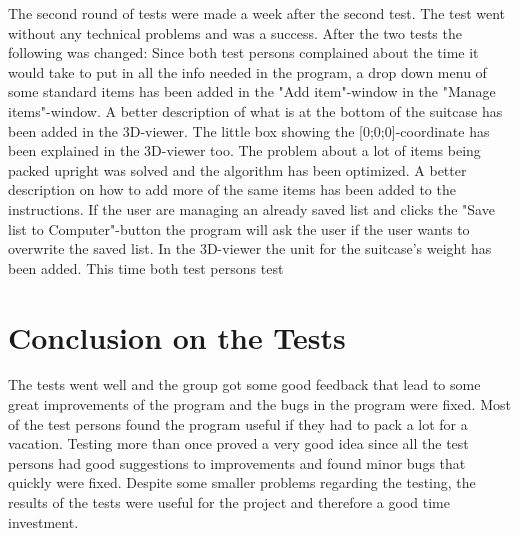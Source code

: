 The second round of tests were made a week after the second test. The test went without any technical problems and was a success. After the two tests the following was changed: Since both test persons complained about the time it would take to put in all the info needed in the program, a drop down menu of some standard items has been added in the "Add item"-window in the "Manage items"-window. A better description of what is at the bottom of the suitcase has been added in the 3D-viewer. The little box showing the [0;0;0]-coordinate has been explained in the 3D-viewer too. The problem about a lot of items being packed upright was solved and the algorithm has been optimized. A better description on how to add more of the same items has been added to the instructions. If the user are managing an already saved list and clicks the "Save list to Computer"-button the program will ask the user if the user wants to overwrite the saved list. In the 3D-viewer the unit for the suitcase's weight has been added. This time both test persons  test

\section{Conclusion on the Tests}
The tests went well and the group got some good feedback that lead to some great improvements of the program and the bugs in the program were fixed. Most of the test persons found the program useful if they had to pack a lot for a vacation. Testing more than once proved a very good idea since all the test persons had good suggestions to improvements and found minor bugs that quickly were fixed. Despite some smaller problems regarding the testing, the results of the tests were useful for the project and therefore a good time investment.